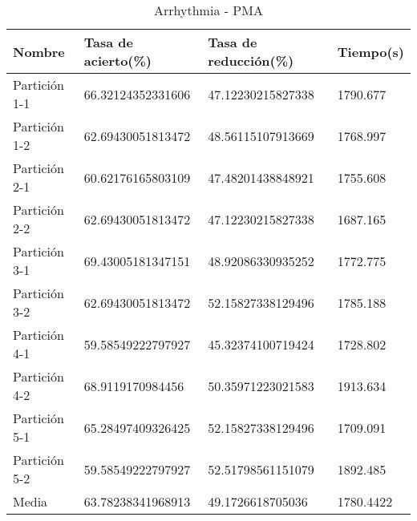 \begin{table}[H]
	\centering
	\begin{tabular}{l|lll}
		Nombre        & Tasa de acierto(\%) & Tasa de reducción(\%) & Tiempo(s) \\ \hline
		Partición 1-1 & 66.32124352331606   & 47.12230215827338     & 1790.677  \\
		Partición 1-2 & 62.69430051813472   & 48.56115107913669     & 1768.997  \\
		Partición 2-1 & 60.62176165803109   & 47.48201438848921     & 1755.608  \\
		Partición 2-2 & 62.69430051813472   & 47.12230215827338     & 1687.165  \\
		Partición 3-1 & 69.43005181347151   & 48.92086330935252     & 1772.775  \\
		Partición 3-2 & 62.69430051813472   & 52.15827338129496     & 1785.188  \\
		Partición 4-1 & 59.58549222797927   & 45.32374100719424     & 1728.802  \\
		Partición 4-2 & 68.9119170984456    & 50.35971223021583     & 1913.634  \\
		Partición 5-1 & 65.28497409326425   & 52.15827338129496     & 1709.091  \\
		Partición 5-2 & 59.58549222797927   & 52.51798561151079     & 1892.485  \\ \hline
		Media         & 63.78238341968913   & 49.1726618705036      & 1780.4422
	\end{tabular}
	\caption{Arrhythmia - PMA}
	\label{ARRH-PMA}
\end{table}